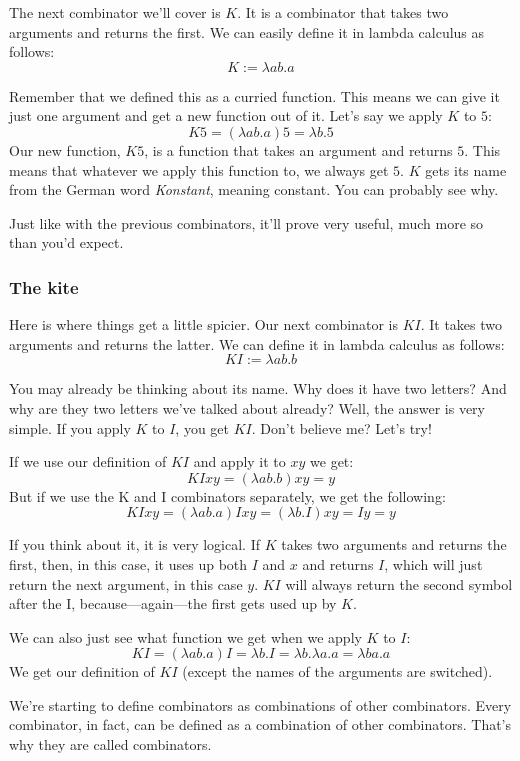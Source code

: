 \documentclass[11pt]{article}
\begin{document}
The next combinator we'll cover is \(K\). It is a combinator that takes two
arguments and returns the first. We can easily define it in lambda calculus as
follows:
\[K:=\lambda ab.a\]

Remember that we defined this as a curried function. This means we can give it
just one argument and get a new function out of it. Let's say we apply \(K\) to
\(5\):
\[K5=(\lambda ab.a)5=\lambda b.5\]
Our new function, \(K5\), is a function that takes an argument and returns
\(5\). This means that whatever we apply this function to, we always get \(5\).
\(K\) gets its name from the German word \emph{Konstant}, meaning constant. You
can probably see why.

Just like with the previous combinators, it'll prove very useful, much more so
than you'd expect.

\subsubsection{The kite}

Here is where things get a little spicier. Our next combinator is \(KI\). It
takes two arguments and returns the latter. We can define it in lambda calculus
as follows:
\[KI:=\lambda ab.b\]

You may already be thinking about its name. Why does it have two letters? And
why are they two letters we've talked about already? Well, the answer is very
simple. If you apply \(K\) to \(I\), you get \(KI\). Don't believe me? Let's
try!

If we use our definition of \(KI\) and apply it to \(xy\) we get:
\[KIxy=(\lambda ab.b)xy=y\]
But if we use the K and I combinators separately, we get the following:
\[KIxy=(\lambda ab.a)Ixy=(\lambda b.I)xy=Iy=y\]

If you think about it, it is very logical. If \(K\) takes two arguments and
returns the first, then, in this case, it uses up both \(I\) and \(x\) and
returns \(I\), which will just return the next argument, in this case \(y\).
\(KI\) will always return the second symbol after the I, because---again---the
first gets used up by \(K\).

We can also just see what function we get when we apply \(K\) to \(I\):
\[KI=(\lambda ab.a)I=\lambda b.I=\lambda b.\lambda a.a=\lambda ba.a\] We get
our definition of \(KI\) (except the names of the arguments are switched).

We're starting to define combinators as combinations of other combinators.
Every combinator, in fact, can be defined as a combination of other
combinators. That's why they are called combinators.
\end{document}
